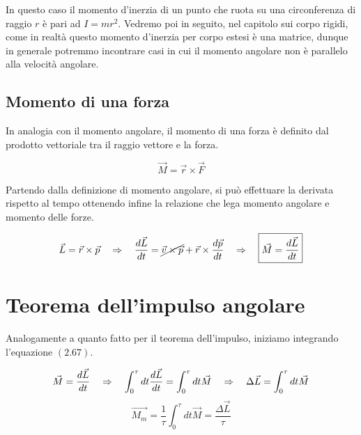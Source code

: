 In questo caso il momento d'inerzia di un punto che ruota su una circonferenza di raggio $r$ è pari ad $I = mr^2$. Vedremo poi in seguito, nel capitolo sui corpo rigidi, come in realtà questo momento d'inerzia per corpo estesi è una matrice, dunque in generale potremmo incontrare casi in cui il momento angolare non è parallelo alla velocità angolare.             

\subsection{Momento di una forza}
In analogia con il momento angolare, il momento di una forza è definito dal prodotto vettoriale tra il raggio vettore e la forza.

\begin{equation}
\boxed{\vec M = \vec r \times \vec F}
\end{equation}

Partendo dalla definizione di momento angolare, si può effettuare la derivata rispetto al tempo ottenendo infine la relazione che lega momento angolare e momento delle forze.

\begin{equation}
\vec L = \vec r \times \vec p \quad\Rightarrow\quad \frac{d\vec L}{dt} = \cancel{\vec v\times\vec p} + \vec r \times \frac{d\vec p}{dt} \quad\Rightarrow\quad \boxed{\vec M = \frac{d\vec L}{dt}}
\end{equation}

\section{Teorema dell'impulso angolare}
Analogamente a quanto fatto per il teorema dell'impulso, iniziamo integrando l'equazione $(2.67)$.

\begin{equation}
\vec M = \frac{d\vec L}{dt} \quad\Rightarrow\quad \int_0^\tau dt\frac{d\vec L}{dt} = \int_0^\tau dt \vec M \quad\Rightarrow\quad \Delta \vec L =\int_0^\tau dt \vec M 
\end{equation}
\begin{equation}
\vec{M_m} = \frac1\tau\int_0^\tau dt \vec M = \frac{\Delta \vec L}{\tau}
\end{equation}














